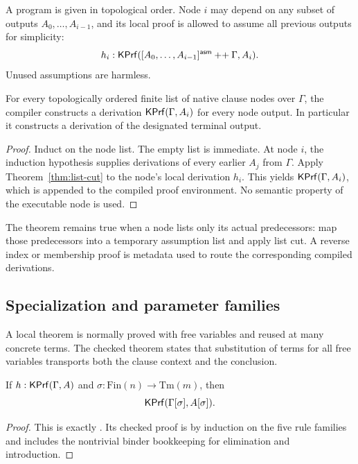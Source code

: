 A program is given in topological order.  Node \(i\) may depend on any subset
of outputs \(A_0,\ldots,A_{i-1}\), and its local proof is allowed to assume all
previous outputs for simplicity:
\[
 h_i:\mathsf{KPrf}([A_0,\ldots,A_{i-1}]^{\mathsf{asm}}
                 \mathbin{++}\Gamma,A_i).
\]
Unused assumptions are harmless.

\begin{theorem}\label{thm:dag-compile}
For every topologically ordered finite list of native clause nodes over
\(\Gamma\), the compiler constructs a derivation
\(\mathsf{KPrf}(\Gamma,A_i)\) for every node output.  In particular it constructs a
derivation of the designated terminal output.
\end{theorem}

\begin{proof}
Induct on the node list.  The empty list is immediate.  At node \(i\), the
induction hypothesis supplies derivations of every earlier \(A_j\) from
\(\Gamma\).  Apply Theorem~\ref{thm:list-cut} to the node's local derivation
\(h_i\).  This yields \(\mathsf{KPrf}(\Gamma,A_i)\), which is appended to the compiled
proof environment.  No semantic property of the executable node is used.
\end{proof}

The theorem remains true when a node lists only its actual predecessors: map
those predecessors into a temporary assumption list and apply list cut.  A
reverse index or membership proof is metadata used to route the corresponding
compiled derivations.

\subsection{Specialization and parameter families}

A local theorem is normally proved with free variables and reused at many
concrete terms.  The checked theorem  states that substitution
of terms for all free variables transports both the clause context and the
conclusion.

\begin{theorem}[Specialization]
If \(h:\mathsf{KPrf}(\Gamma,A)\) and
\(\sigma:\mathrm{Fin}(n)\to\mathrm{Tm}(m)\), then
\[
 \mathsf{KPrf}(\Gamma[\sigma],A[\sigma]).
\]
\end{theorem}

\begin{proof}
This is exactly .  Its checked proof is by induction on the
five rule families and includes the nontrivial binder bookkeeping for
elimination and introduction.
\end{proof}

